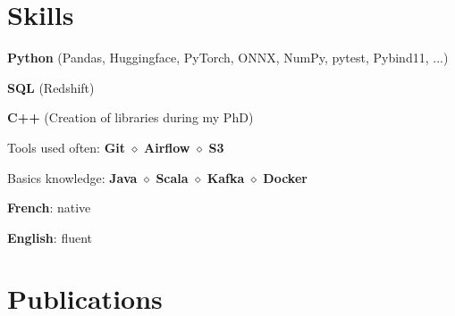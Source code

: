 \documentclass[]{deedy-resume-openfont}
\begin{document}

\newpage

	\section{Skills}
	\sectionsep

	\sectionsep
	\vspace{0.1cm}
	\begin{tightemize}
		\item[\diamond] \textbf{Python} (Pandas, Huggingface, PyTorch, ONNX, NumPy, pytest, Pybind11, ...)
		\item[\diamond] \textbf{SQL} (Redshift)
		\item[\diamond] \textbf{C++} (Creation of libraries during my PhD)
		\item[\diamond] Tools used often: \textbf{Git} $\diamond$ \textbf{Airflow} $\diamond$ \textbf{S3}
		\item[\diamond] Basics knowledge: \textbf{Java} $\diamond$ \textbf{Scala} $\diamond$ \textbf{Kafka} $\diamond$ \textbf{Docker}
	\end{tightemize}


	\sectionsep
	\sectionsep

	\sectionsep
	\vspace{0.1cm}
	\begin{tightemize}
		\item[\diamond] \textbf{French}: native
		\item[\diamond] \textbf{English}: fluent
	\end{tightemize}

		\sectionsep
		\sectionsep

		\section{Publications}
		\sectionsep
	
\end{document}
